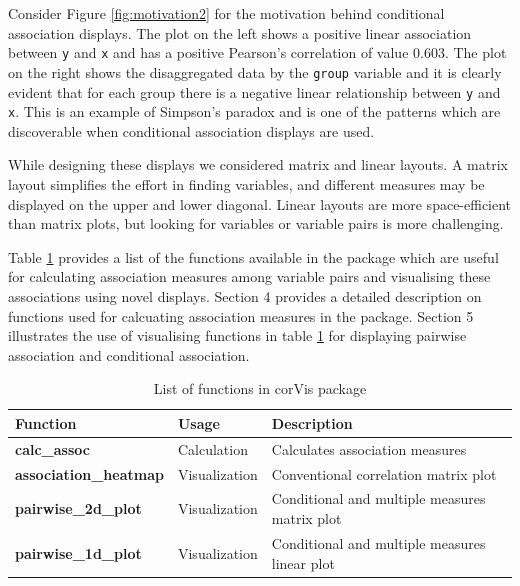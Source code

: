 Consider Figure \ref{fig:motivation2} for the motivation behind
conditional association displays. The plot on the left shows a positive
linear association between \texttt{y} and \texttt{x} and has a positive
Pearson's correlation of value 0.603. The plot on the right shows the
disaggregated data by the \texttt{group} variable and it is clearly
evident that for each group there is a negative linear relationship
between \texttt{y} and \texttt{x}. This is an example of Simpson's
paradox and is one of the patterns which are discoverable when
conditional association displays are used.

While designing these displays we considered matrix and linear layouts.
A matrix layout simplifies the effort in finding variables, and
different measures may be displayed on the upper and lower diagonal.
Linear layouts are more space-efficient than matrix plots, but looking
for variables or variable pairs is more challenging.

Table \ref{tab:function-corVis} provides a list of the functions
available in the package which are useful for calculating association
measures among variable pairs and visualising these associations using
novel displays. Section 4 provides a detailed description on functions
used for calcuating association measures in the package. Section 5
illustrates the use of visualising functions in table
\ref{tab:function-corVis} for displaying pairwise association and
conditional association.

\begin{Schunk}
\begin{table}

\caption{\label{tab:function-corVis}List of functions in corVis package}
\centering
\begin{tabular}[t]{>{}l|l|l}
\hline
Function & Usage & Description\\
\hline
\textbf{calc\_assoc} & Calculation & Calculates association measures\\
\hline
\textbf{association\_heatmap} & Visualization & Conventional correlation matrix plot\\
\hline
\textbf{pairwise\_2d\_plot} & Visualization & Conditional and multiple measures matrix plot\\
\hline
\textbf{pairwise\_1d\_plot} & Visualization & Conditional and multiple measures linear plot\\
\hline
\end{tabular}
\end{table}

\end{Schunk}

